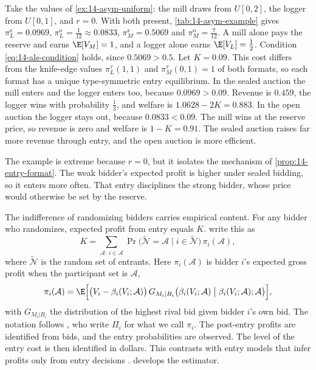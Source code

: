 \begin{example}\label{ex:14-als-entry}
Take the values of \cref{ex:14-asym-uniform}: the mill draws from $U[0,2]$, the logger from
$U[0,1]$, and $r=0$. With both present, \cref{tab:14-asym-example} gives
$\pi_L^{\mathrm{s}}=0.0969$, $\pi_L^{\mathrm{o}}=\frac{1}{12}\approx 0.0833$,
$\pi_M^{\mathrm{s}}=0.5069$ and $\pi_M^{\mathrm{o}}=\frac{7}{12}$. A mill alone pays the reserve and
earns $\E[V_M]=1$, and a logger alone earns $\E[V_L]=\frac{1}{2}$. Condition
\eqref{eq:14-als-condition} holds, since $0.5069>0.5$. Let $K=0.09$. This cost differs from the
knife-edge values $\pi_L^\tau(1,1)$ and $\pi_M^\tau(0,1)=1$ of both formats, so each format has a
unique type-symmetric entry equilibrium. In the sealed auction the mill
enters and the logger enters too, because $0.0969>0.09$. Revenue is $0.459$, the logger wins with
probability $\frac{1}{3}$, and welfare is $1.0628-2K=0.883$. In the open auction the logger stays
out, because $0.0833<0.09$. The mill wins at the reserve price, so revenue is zero and welfare is
$1-K=0.91$. The sealed auction raises far more revenue through entry, and the open auction is more
efficient.
\end{example}

The example is extreme because $r=0$, but it isolates the mechanism of \cref{prop:14-entry-format}.
The weak bidder's expected profit is higher under sealed bidding, so it enters more often. That entry
disciplines the strong bidder, whose price would otherwise be set by the reserve.

The indifference of randomizing bidders carries empirical content. For any bidder who randomizes,
expected profit from entry equals $K$. \citet[Section 6.3.2]{AtheyHaile2007} write this as
\begin{equation}\label{eq:14-entry-cost-id}
K=\sum_{\mathcal A:\,i\in\mathcal A}\Pr\bigl(\tilde{\mathcal N}=\mathcal A\mid i\in\tilde{\mathcal
N}\bigr)\,\pi_i(\mathcal A),
\end{equation}
where $\tilde{\mathcal N}$ is the random set of entrants. Here $\pi_i(\mathcal A)$ is bidder $i$'s
expected gross profit when the participant set is $\mathcal A$,
\begin{equation}\label{eq:14-entry-profit-id}
\pi_i(\mathcal A)=\E\Bigl[\bigl(V_i-\beta_i(V_i;\mathcal A)\bigr)\,G_{M_i|B_i}\bigl(\beta_i(V_i;\mathcal
A)\bigm|\beta_i(V_i;\mathcal A);\mathcal A\bigr)\Bigr],
\end{equation}
with $G_{M_i|B_i}$ the distribution of the highest rival bid given bidder $i$'s own bid. The notation
follows \citet[Section 6.3.2]{AtheyHaile2007}, who write $\Pi_i$ for what we call $\pi_i$. The post-entry profits are identified
from bids, and the entry probabilities are observed. The level of the entry cost is then identified
in dollars. This contrasts with entry models that infer profits only from entry decisions
\citep[Section 6.3.2]{AtheyHaile2007}.  develops the estimator.

